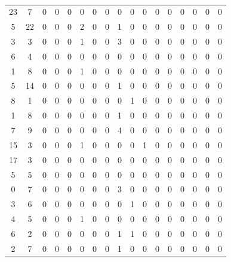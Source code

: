 \documentclass[a4paper]{article}
\begin{document}
\begin{table}[t]
\centering
\begin{tabular}{ c | c |c |c |c |c |c |c |c |c |c |c |c |c |c |c | | c }
\hline	

	23   &  7 &    0 &    0   &  0   &  0  &   0 &    0   &  0    & 0   &  0  &   0  &   0 &    0  &   0 &    0  &   0\\
     5   & 22   &  0  &   0   &  0   &  2   &  0   &  0   &  1   &  0   &  0  &   0  &   0  &   0  &   0  &   0  &   0\\
     3   &  3   &  0  &   0   &  0   &  1   &  0   &  0   &  3   &  0   &  0  &   0  &   0  &   0   &  0  &   0  &   0\\
     6   &  4   &  0  &   0   &  0   &  0   &  0   &  0   &  0   &  0   &  0  &   0  &   0  &   0   &  0  &   0  &   0\\
     1   &  8   &  0  &   0   &  0   &  1   &  0   &  0   &  0   &  0   &  0  &   0  &   0  &   0   &  0  &   0  &   0\\
     5   & 14   &  0  &   0   &  0    & 0   &  0  &   0   &  1   &  0   &  0  &   0  &   0  &   0   &  0   &  0  &   0\\
     8   &  1   &  0  &   0   &  0    & 0  &   0  &   0   &  0   &  1   &  0  &   0  &   0  &   0   &  0 &    0   &  0\\
     1   &  8   &  0   &  0   &  0    & 0   &  0  &   0   &  1   &  0   &  0  &   0  &   0  &   0   &  0  &   0   &  0\\
     7   &  9   &  0   &  0   &  0    & 0   &  0   &  0   &  4   &  0   &  0  &   0  &   0  &   0   &  0  &   0   &  0\\
    15   &  3   &  0   &  0   &  0    & 1   &  0   &  0   &  0   &  0   &  1  &   0  &   0  &   0   &  0   &  0  &   0\\
    17   &  3   &  0   &  0   &  0    & 0   &  0   &  0   &  0   &  0   &  0  &   0  &   0  &   0   &  0   &  0  &   0\\
     5   &  5    & 0   &  0   &  0   &  0   &  0   &  0   &  0   &  0   &  0  &   0  &   0  &   0   &  0   &  0   &  0\\
     0   &  7   &  0   &  0   &  0   &  0   &  0   &  0   &  3   &  0   &  0  &   0  &   0  &   0   &  0   &  0   &  0\\
     3   &  6   &  0   &  0   &  0   &  0   &  0   &  0  &   0   &  1   &  0  &   0  &   0  &   0   &  0  &   0   &  0\\
     4   &  5   &  0   &  0   &  0   &  1   &  0   &  0  &   0   &  0   &  0  &   0  &   0  &   0   &  0  &   0   &  0\\
     6   & 2   &  0    & 0    & 0    & 0    & 0    & 0   &  1    & 1    & 0    & 0   &  0   &  0    & 0   &  0   &  0\\
     2   &  7  &   0   &  0   &  0   &  0   &  0   &  0   &  1   &  0   &  0   &  0   &  0  &   0   &  0  &   0  &   0\\
     
     
\end{tabular}
\caption{}
\label{table:table4}
\end{table}
\end{document}
